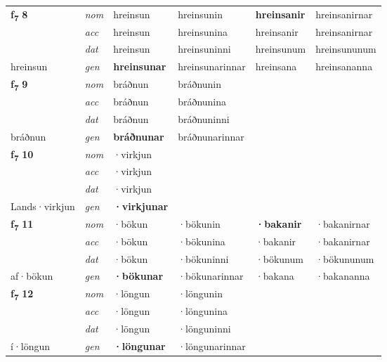 \begin{longtable}[l]{X>{\footnotesize\itshape}XXXXX}
\multirow{3}{*}{{{\textbf{f{\textsubscript{7}}} \Large{\textbf{8}}}}} & nom & hreinsun & hreinsunin & \textbf{hreinsanir} & hreinsanirnar \\*
 & acc & hreinsun & hreinsunina & hreinsanir & hreinsanirnar \\*
 & dat & hreinsun & hreinsuninni & hreinsunum & hreinsununum \\*
 {\footnotesize{hreinsun}} & gen & \textbf{hreinsunar} & hreinsunarinnar & hreinsana & hreinsananna \\
\cmidrule{1-6}

\multirow{3}{*}{{{\textbf{f{\textsubscript{7}}} \Large{\textbf{9}}}}} & nom & bráðnun & bráðnunin & \textbf{} &  \\*
 & acc & bráðnun & bráðnunina &  &  \\*
 & dat & bráðnun & bráðnuninni &  &  \\*
 {\footnotesize{bráðnun}} & gen & \textbf{bráðnunar} & bráðnunarinnar &  &  \\
\cmidrule{1-6}

\multirow{3}{*}{{{\textbf{f{\textsubscript{7}}} \Large{\textbf{10}}}}} & nom & ·virkjun &  & \textbf{} &  \\*
 & acc & ·virkjun &  &  &  \\*
 & dat & ·virkjun &  &  &  \\*
 {\footnotesize{Lands\allowbreak ·virkjun}} & gen & \textbf{·virkjunar} &  &  &  \\
\cmidrule{1-6}

\multirow{3}{*}{{{\textbf{f{\textsubscript{7}}} \Large{\textbf{11}}}}} & nom & ·bökun & ·bökunin & \textbf{·bakanir} & ·bakanirnar \\*
 & acc & ·bökun & ·bökunina & ·bakanir & ·bakanirnar \\*
 & dat & ·bökun & ·bökuninni & ·bökunum & ·bökununum \\*
 {\footnotesize{af\allowbreak ·bökun}} & gen & \textbf{·bökunar} & ·bökunarinnar & ·bakana & ·bakananna \\


\multirow{3}{*}{{{\textbf{f{\textsubscript{7}}} \Large{\textbf{12}}}}} & nom & ·löngun & ·löngunin & \textbf{} &  \\*
 & acc & ·löngun & ·löngunina &  &  \\*
 & dat & ·löngun & ·lönguninni &  &  \\*
 {\footnotesize{í\allowbreak ·löngun}} & gen & \textbf{·löngunar} & ·löngunarinnar &  &  \\
\cmidrule{1-6}


\end{longtable}
